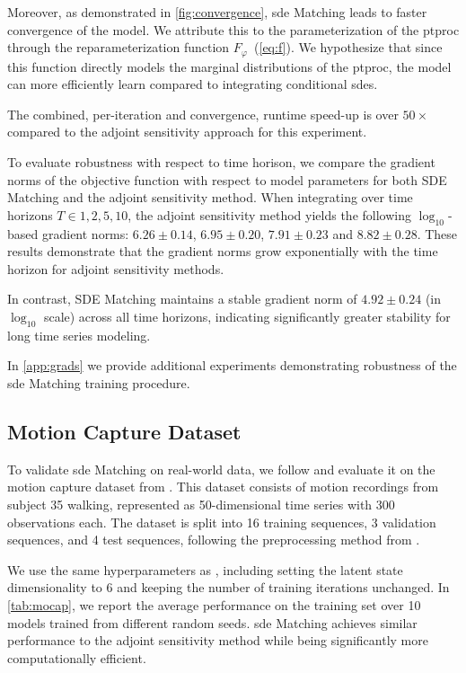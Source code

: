 \documentclass{article}
\def\ph{\varphi}
\theoremstyle{plain}
\theoremstyle{definition}
\theoremstyle{remark}
\begin{document}
Moreover, as demonstrated in \cref{fig:convergence}, \gls{sde} Matching leads to faster convergence of the model. We attribute this to the parameterization of the \gls{ptproc} through the reparameterization function $F_\ph$~(\cref{eq:f}). We hypothesize that since this function directly models the marginal distributions of the \gls{ptproc}, the model can more efficiently learn compared to integrating conditional \glspl{sde}.


The combined, per-iteration and convergence, runtime speed-up is over $50\times$ compared to the adjoint sensitivity approach for this experiment.


To evaluate robustness with respect to time horison, we compare the gradient norms of the objective function with respect to model parameters for both SDE Matching and the adjoint sensitivity method. When integrating over time horizons $T \in {1, 2, 5, 10}$, the adjoint sensitivity method yields the following $\log_{10}$-based gradient norms:  $6.26 \pm 0.14$, $6.95 \pm 0.20$, $7.91 \pm 0.23$ and $8.82 \pm 0.28$. These results demonstrate that the gradient norms grow exponentially with the time horizon for adjoint sensitivity methods.


In contrast, SDE Matching maintains a stable gradient norm of $4.92 \pm 0.24$ (in $\log_{10}$ scale) across all time horizons, indicating significantly greater stability for long time series modeling.


In \cref{app:grads} we provide additional experiments demonstrating robustness of the \gls{sde} Matching training procedure.


\subsection{Motion Capture Dataset}
\label{sec:mocap}


To validate \gls{sde} Matching on real-world data, we follow \citet{li2020scalable,course2024amortized} and evaluate it on the motion capture dataset from \citet{gan2015deep}. This dataset consists of motion recordings from subject 35 walking, represented as 50-dimensional time series with 300 observations each. The dataset is split into 16 training sequences, 3 validation sequences, and 4 test sequences, following the preprocessing method from \citet{wang2007gaussian}.


We use the same hyperparameters as \citet{li2020scalable}, including setting the latent state dimensionality to 6 and keeping the number of training iterations unchanged. In \cref{tab:mocap}, we report the average performance on the training set over 10 models trained from different random seeds. \gls{sde} Matching achieves similar performance to the adjoint sensitivity method while being significantly more computationally efficient. 
\end{document}
